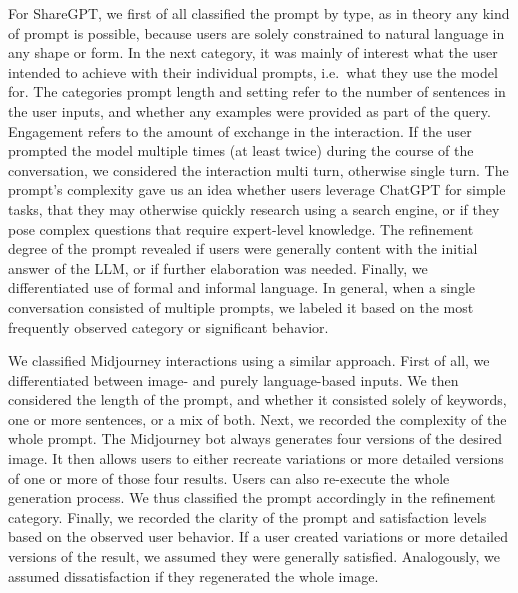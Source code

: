 For ShareGPT, we first of all classified the prompt by type, as in theory any kind of prompt is
possible, because users are solely constrained to natural language in any shape or form.
In the next category, it was mainly of interest what the user intended to achieve with their
individual prompts,
i.e.\ what they use the model for.
The categories prompt length and setting refer to the number of sentences in the user inputs, and
whether any examples were provided as part of the query.
Engagement refers to the amount of exchange in the interaction.
If the user prompted the model multiple times (at least twice) during the course of the
conversation, we considered the interaction multi turn, otherwise single turn.
The prompt's complexity gave us an idea whether users leverage ChatGPT for simple
tasks, that they may otherwise quickly research using a search engine, or if they pose complex
questions that require expert-level knowledge.
The refinement degree of the prompt revealed if users were generally content with the initial
answer of the LLM, or if further elaboration was needed.
Finally, we differentiated use of formal and informal language.
In general, when a single conversation consisted of multiple prompts, we labeled it based on the
most frequently observed category or significant behavior.

We classified Midjourney interactions using a similar approach.
First of all, we differentiated between image- and purely language-based inputs.
We then considered the length of the prompt, and whether it consisted solely of keywords, one
or more sentences, or a mix of both.
Next, we recorded the complexity of the whole prompt.
The Midjourney bot always generates four versions of the desired image.
It then allows users to either recreate variations or more detailed versions of one or more of
those four results.
Users can also re-execute the whole generation process.
We thus classified the prompt accordingly in the refinement category.
Finally, we recorded the clarity of the prompt and satisfaction levels based
on the observed user behavior.
If a user created variations or more detailed versions of the result, we assumed they were
generally satisfied.
Analogously, we assumed dissatisfaction if they regenerated the whole image.

